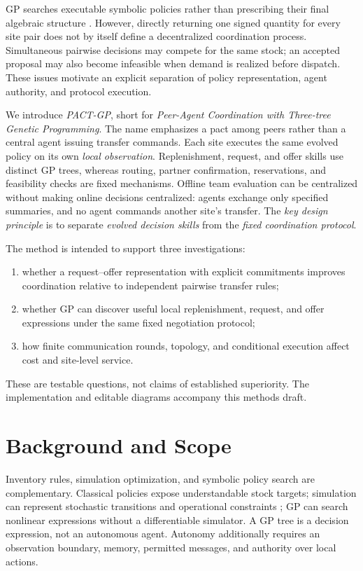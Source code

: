 \documentclass[journal]{IEEEtran}
\begin{document}
GP searches executable symbolic policies rather than prescribing their final
algebraic structure \cite{koza1992genetic,poligp2008fieldguide}.
However, directly returning one signed quantity for every site pair does not
by itself define a decentralized coordination process. Simultaneous pairwise
decisions may compete for the same stock; an accepted proposal may also become
infeasible when demand is realized before dispatch.
These issues motivate an explicit separation of policy representation,
agent authority, and protocol execution.

We introduce \emph{PACT-GP}, short for \emph{Peer-Agent Coordination with
Three-tree Genetic Programming}. The name emphasizes a pact among peers
rather than a central agent issuing transfer commands. Each site executes the
same evolved policy on its own \emph{local observation}. Replenishment, request, and offer
skills use distinct GP trees, whereas routing, partner confirmation,
reservations, and feasibility checks are fixed mechanisms. Offline team
evaluation can be centralized without making online decisions centralized:
agents exchange only specified summaries, and no agent commands another
site's transfer.
The \emph{key design principle} is to separate \emph{evolved decision skills}
from the \emph{fixed coordination protocol}.

The method is intended to support three investigations:
\begin{enumerate}
    \item whether a request--offer representation with explicit commitments
    improves coordination relative to independent pairwise transfer rules;
    \item whether GP can discover useful local replenishment, request, and
    offer expressions under the same fixed negotiation protocol;
    \item how finite communication rounds, topology, and conditional execution
    affect cost and site-level service.
\end{enumerate}
These are testable questions, not claims of established superiority.
The implementation and editable diagrams accompany this methods draft.

\section{Background and Scope}
Inventory rules, simulation optimization, and symbolic policy search are
complementary. Classical policies expose understandable stock targets;
simulation can represent stochastic transitions and operational constraints
\cite{amaran2016simulation}; GP can search nonlinear expressions without a
differentiable simulator. A GP tree is a decision expression, not an autonomous
agent. Autonomy additionally requires an observation boundary, memory,
permitted messages, and authority over local actions.
\end{document}
